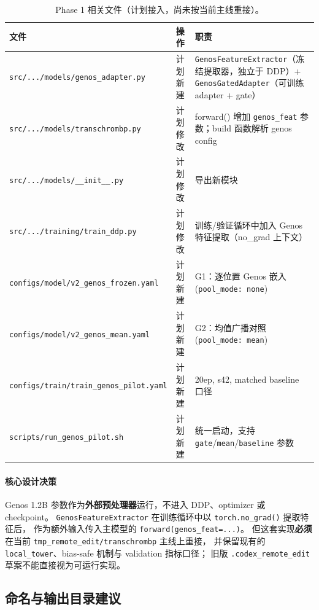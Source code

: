 \documentclass[11pt,a4paper]{ctexart}
\begin{document}
\begin{table}[H]
\centering
\small
\caption{Phase 1 相关文件（计划接入，尚未按当前主线重接）。}
\label{tab:phase1_files}
\begin{tabularx}{\textwidth}{l l Y}
\toprule
文件 & 操作 & 职责 \\
\midrule
\texttt{src/.../models/genos\_adapter.py} & 计划新建 & \texttt{GenosFeatureExtractor}（冻结提取器，独立于 DDP）+ \texttt{GenosGatedAdapter}（可训练 adapter + gate） \\
\texttt{src/.../models/transchrombp.py} & 计划修改 & forward() 增加 \texttt{genos\_feat} 参数；build 函数解析 genos config \\
\texttt{src/.../models/\_\_init\_\_.py} & 计划修改 & 导出新模块 \\
\texttt{src/.../training/train\_ddp.py} & 计划修改 & 训练/验证循环中加入 Genos 特征提取（no\_grad 上下文） \\
\texttt{configs/model/v2\_genos\_frozen.yaml} & 计划新建 & G1：逐位置 Genos 嵌入 (\texttt{pool\_mode: none}) \\
\texttt{configs/model/v2\_genos\_mean.yaml} & 计划新建 & G2：均值广播对照 (\texttt{pool\_mode: mean}) \\
\texttt{configs/train/train\_genos\_pilot.yaml} & 计划新建 & 20ep, s42, matched baseline 口径 \\
\texttt{scripts/run\_genos\_pilot.sh} & 计划新建 & 统一启动，支持 \texttt{gate}/\texttt{mean}/\texttt{baseline} 参数 \\
\bottomrule
\end{tabularx}
\end{table}

\paragraph{核心设计决策}
Genos 1.2B 参数作为\textbf{外部预处理器}运行，不进入 DDP、optimizer 或 checkpoint。
\texttt{GenosFeatureExtractor} 在训练循环中以 \texttt{torch.no\_grad()} 提取特征后，
作为额外输入传入主模型的 \texttt{forward(genos\_feat=...)}。
但这套实现\textbf{必须}在当前 \texttt{tmp\_remote\_edit/transchrombp} 主线上重接，
并保留现有的 \texttt{local\_tower}、bias-safe 机制与 validation 指标口径；
旧版 \texttt{.codex\_remote\_edit} 草案不能直接视为可运行实现。

\subsection{命名与输出目录建议}
\end{document}
